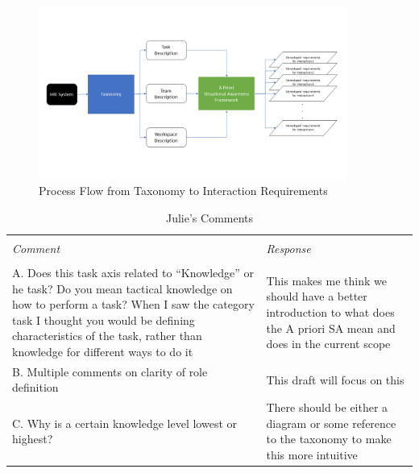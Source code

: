 \documentclass[letterpaper, 10 pt, conference]{ieeeconf} %
\theoremstyle{definition} \newtheorem{definition}{Definition}
\begin{document}
\begin{figure}[t!]
  \includegraphics[width=0.9\textwidth]{apsa.png}
  \caption{Process Flow from Taxonomy to Interaction Requirements}
\end{figure}

\begin{table}[b!]
  \caption{Julie's Comments}
  \begin{tabular}{p{8cm} p{8cm}}
    \toprule                                                                                               \\
    \textit{Comment}                                            & \textit{Response}                        \\
    \midrule                                                                                               \\
    A. Does this task axis related to ``Knowledge'' or he task? Do you mean tactical knowledge on how to
    perform a task? When I saw the category task I thought you would be defining characteristics of
    the task, rather than knowledge for different ways to do it & This makes me think we should
    have a better introduction to what does the A priori SA mean and does in the current scope             \\
    B. Multiple comments on clarity of role definition          & This draft will focus on this            \\
    C. Why is a certain knowledge level lowest or highest?      & There should be either a diagram or some
    reference to the taxonomy to make this more intuitive                                                  \\
    \bottomrule
  \end{tabular}
\end{table}
\end{document}

